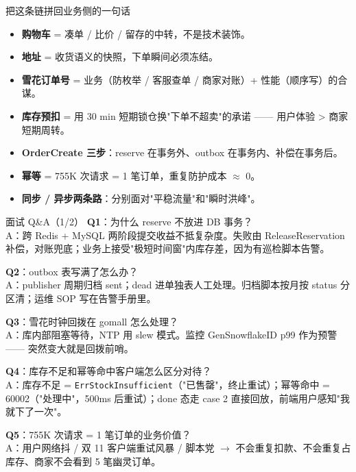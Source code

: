 \documentclass[aspectratio=169,11pt]{beamer}
\begin{document}
\begin{frame}[shrink]{把这条链拼回业务侧的一句话}
\begin{itemize}
  \item \textbf{购物车} = 凑单 / 比价 / 留存的中转，不是技术装饰。
  \item \textbf{地址} = 收货语义的快照，下单瞬间必须冻结。
  \item \textbf{雪花订单号} = 业务（防枚举 / 客服查单 / 商家对账）+ 性能（顺序写）的合谋。
  \item \textbf{库存预扣} = 用 30 min 短期锁仓换"下单不超卖"的承诺 —— 用户体验 > 商家短期周转。
  \item \textbf{OrderCreate 三步}：reserve 在事务外、outbox 在事务内、补偿在事务后。
  \item \textbf{幂等} = 755K 次请求 = 1 笔订单，重复防护成本 $\approx$ 0。
  \item \textbf{同步 / 异步两条路}：分别面对"平稳流量"和"瞬时洪峰"。
\end{itemize}
\vspace{2mm}
\end{frame}

\appendix

\begin{frame}[shrink]{面试 Q\&A（1/2）}
\small
\textbf{Q1}：为什么 reserve 不放进 DB 事务？\\
\hspace{4mm}A：跨 Redis + MySQL 两阶段提交收益不抵复杂度。失败由 ReleaseReservation 补偿，对账兜底；业务上接受"极短时间窗"内库存差，因为有巡检脚本告警。
\vspace{1mm}

\textbf{Q2}：outbox 表写满了怎么办？\\
\hspace{4mm}A：publisher 周期归档 sent；dead 进单独表人工处理。归档脚本按月按 status 分区清；运维 SOP 写在告警手册里。
\vspace{1mm}

\textbf{Q3}：雪花时钟回拨在 gomall 怎么处理？\\
\hspace{4mm}A：库内部阻塞等待，NTP 用 slew 模式。监控 GenSnowflakeID p99 作为预警 —— 突然变大就是回拨前哨。
\vspace{1mm}

\textbf{Q4}：库存不足和幂等命中客户端怎么区分对待？\\
\hspace{4mm}A：库存不足 = \texttt{ErrStockInsufficient}（"已售罄"，终止重试）；幂等命中 = 60002（"处理中"，500ms 后重试）；done 态走 case 2 直接回放，前端用户感知"我就下了一次"。
\vspace{1mm}

\textbf{Q5}：755K 次请求 = 1 笔订单的业务价值？\\
\hspace{4mm}A：用户网络抖 / 双 11 客户端重试风暴 / 脚本党 $\to$ 不会重复扣款、不会重复占库存、商家不会看到 5 笔幽灵订单。
\end{frame}
\end{document}
